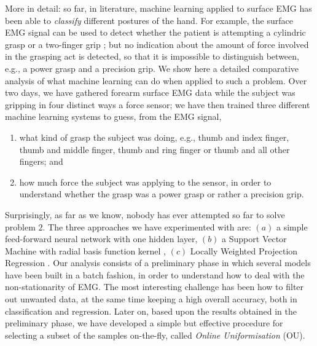 More in detail: so far, in literature, machine learning applied to
surface EMG has been able to \emph{classify} different postures of the
hand. For example, the surface EMG signal can be used to detect
whether the patient is attempting a cylindric grasp or a two-finger
grip \cite{ekvall}; but no indication about the amount of force
involved in the grasping act is detected, so that it is impossible to
distinguish between, e.g., a power grasp and a precision grip. We show
here a detailed comparative analysis of what machine learning can do
when applied to such a problem. Over two days, we have gathered
forearm surface EMG data while the subject was gripping in four
distinct ways a force sensor; we have then trained three different
machine learning systems to guess, from the EMG signal,

\begin{enumerate}

  \item what kind of grasp the subject was doing, e.g., thumb and
    index finger, thumb and middle finger, thumb and ring finger or
    thumb and all other fingers; and

  \item how much force the subject was applying to the sensor, in
    order to understand whether the grasp was a power grasp or rather
    a precision grip.

\end{enumerate}

Surprisingly, as far as we know, nobody has ever attempted so far to
solve problem $2$. The three approaches we have experimented with are:
$(a)$ a simple feed-forward neural network with one hidden layer,
$(b)$ a Support Vector Machine with radial basis function kernel
\cite{BGV92}, $(c)$ Locally Weighted Projection Regression
\cite{lwpr}. Our analysis consists of a preliminary phase in which
several models have been built in a batch fashion, in order to
understand how to deal with the non-stationarity of EMG. The most
interesting challenge has been how to filter out unwanted data, at the
same time keeping a high overall accuracy, both in classification and
regression. Later on, based upon the results obtained in the
preliminary phase, we have developed a simple but effective procedure
for selecting a subset of the samples on-the-fly, called \emph{Online
Uniformisation} (OU).

